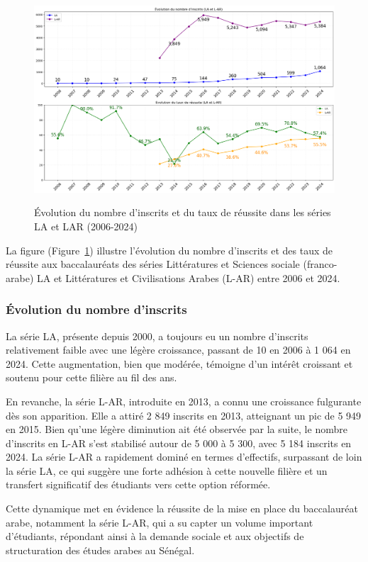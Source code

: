 \begin{figure}[ht]
\centering
\caption{Évolution du nombre d'inscrits et du taux de réussite dans les séries LA et LAR (2006-2024)}
\includegraphics[width=1\textwidth]{figure/bac_LA_LAR.png}
\label{fig:LA_LAR}
\end{figure}

La figure (Figure~\ref{fig:LA_LAR}) illustre l'évolution du nombre d'inscrits et des taux de réussite aux baccalauréats des séries Littératures et Sciences sociale (franco-arabe) LA et Littératures et Civilisations Arabes (L-AR) entre 2006 et 2024.

\subsubsection{Évolution du nombre d'inscrits}

La série LA, présente depuis 2000, a toujours eu un nombre d'inscrits relativement faible avec une légère croissance, passant de 10 en 2006 à 1 064 en 2024.  
Cette augmentation, bien que modérée, témoigne d'un intérêt croissant et soutenu pour cette filière au fil des ans.

En revanche, la série L-AR, introduite en 2013, a connu une croissance fulgurante dès son apparition. 
Elle a attiré 2 849 inscrits en 2013, atteignant un pic de 5 949 en 2015. Bien qu'une légère diminution ait été observée par la suite, le nombre d'inscrits en L-AR s'est stabilisé autour de 5 000 à 5 300, avec 5 184 inscrits en 2024. 
La série L-AR a rapidement dominé en termes d'effectifs, surpassant de loin la série LA, ce qui suggère une forte adhésion à cette nouvelle filière et un transfert significatif des étudiants vers cette option réformée.

Cette dynamique met en évidence la réussite de la mise en place du baccalauréat arabe, notamment la série L-AR, qui a su capter un volume important d'étudiants, répondant ainsi à la demande sociale et aux objectifs de structuration des études arabes au Sénégal.

